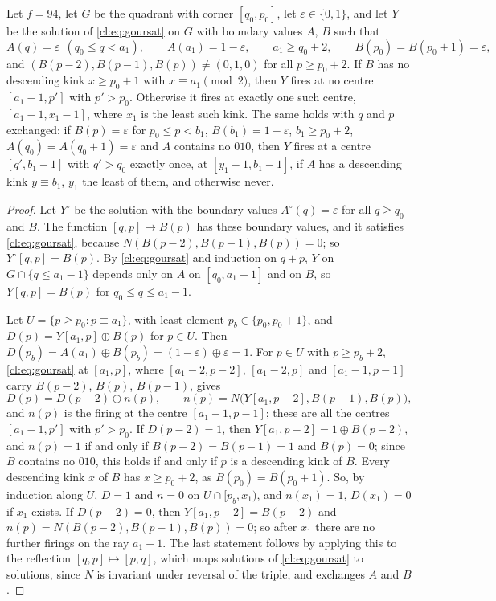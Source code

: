 \begin{lemma}\label{cl:lem:ray}
Let $f=94$, let $G$ be the quadrant with corner $[q_0,p_0]$, let $\varepsilon\in\{0,1\}$, and let $Y$ be the solution of \eqref{cl:eq:goursat} on $G$ with boundary values $A$, $B$ such that
\[
A(q)=\varepsilon\ \ (q_0\le q<a_1),\qquad A(a_1)=1-\varepsilon,\qquad a_1\ge q_0+2,\qquad B(p_0)=B(p_0+1)=\varepsilon,
\]
and $(B(p-2),B(p-1),B(p))\ne(0,1,0)$ for all $p\ge p_0+2$. If $B$ has no descending kink $x\ge p_0+1$ with $x\equiv a_1\pmod2$, then $Y$ fires at no centre $[a_1-1,p']$ with $p'>p_0$. Otherwise it fires at exactly one such centre, $[a_1-1,x_1-1]$, where $x_1$ is the least such kink. The same holds with $q$ and $p$ exchanged: if $B(p)=\varepsilon$ for $p_0\le p<b_1$, $B(b_1)=1-\varepsilon$, $b_1\ge p_0+2$, $A(q_0)=A(q_0+1)=\varepsilon$ and $A$ contains no $010$, then $Y$ fires at a centre $[q',b_1-1]$ with $q'>q_0$ exactly once, at $[y_1-1,b_1-1]$, if $A$ has a descending kink $y\equiv b_1$, $y_1$ the least of them, and otherwise never.
\end{lemma}

\begin{proof}
Let $Y^\circ$ be the solution with the boundary values $A^\circ(q)=\varepsilon$ for all $q\ge q_0$ and $B$. The function $[q,p]\mapsto B(p)$ has these boundary values, and it satisfies \eqref{cl:eq:goursat}, because $N(B(p-2),B(p-1),B(p))=0$; so $Y^\circ[q,p]=B(p)$. By \eqref{cl:eq:goursat} and induction on $q+p$, $Y$ on $G\cap\{q\le a_1-1\}$ depends only on $A$ on $[q_0,a_1-1]$ and on $B$, so $Y[q,p]=B(p)$ for $q_0\le q\le a_1-1$.

Let $U=\{p\ge p_0:p\equiv a_1\}$, with least element $p_b\in\{p_0,p_0+1\}$, and $D(p)=Y[a_1,p]\oplus B(p)$ for $p\in U$. Then $D(p_b)=A(a_1)\oplus B(p_b)=(1-\varepsilon)\oplus\varepsilon=1$. For $p\in U$ with $p\ge p_b+2$, \eqref{cl:eq:goursat} at $[a_1,p]$, where $[a_1-2,p-2]$, $[a_1-2,p]$ and $[a_1-1,p-1]$ carry $B(p-2)$, $B(p)$, $B(p-1)$, gives
\[
D(p)=D(p-2)\oplus n(p),\qquad n(p)=N\bigl(Y[a_1,p-2],B(p-1),B(p)\bigr),
\]
and $n(p)$ is the firing at the centre $[a_1-1,p-1]$; these are all the centres $[a_1-1,p']$ with $p'>p_0$. If $D(p-2)=1$, then $Y[a_1,p-2]=1\oplus B(p-2)$, and $n(p)=1$ if and only if $B(p-2)=B(p-1)=1$ and $B(p)=0$; since $B$ contains no $010$, this holds if and only if $p$ is a descending kink of $B$. Every descending kink $x$ of $B$ has $x\ge p_0+2$, as $B(p_0)=B(p_0+1)$. So, by induction along $U$, $D=1$ and $n=0$ on $U\cap[p_b,x_1)$, and $n(x_1)=1$, $D(x_1)=0$ if $x_1$ exists. If $D(p-2)=0$, then $Y[a_1,p-2]=B(p-2)$ and $n(p)=N(B(p-2),B(p-1),B(p))=0$; so after $x_1$ there are no further firings on the ray $a_1-1$. The last statement follows by applying this to the reflection $[q,p]\mapsto[p,q]$, which maps solutions of \eqref{cl:eq:goursat} to solutions, since $N$ is invariant under reversal of the triple, and exchanges $A$ and $B$.
\end{proof}

